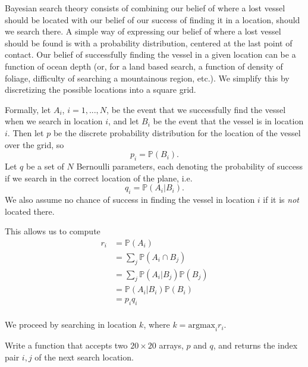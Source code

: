 Bayesian search theory consists of combining our belief of where a lost vessel should be located with our belief of our success of finding it in a location, should we search there. A simple way of expressing our belief of where a lost vessel should be found is with a probability distribution, centered at the last point of contact. Our belief of successfully finding the vessel in a given location can be a function of ocean depth (or, for a land based search, a function of density of foliage, difficulty of searching a mountainous region, etc.). We simplify this by discretizing the possible locations into a square grid.

Formally, let $A_{i}$, $i=1,...,N$, be the event that we successfully find the vessel when we search in location $i$, and let $B_{i}$ be the event that the vessel is in location $i$. Then let $p$ be the discrete probability distribution for the location of the vessel over the grid, so 
\begin{equation*}
p_{i} = \mathbb{P}(B_{i}).
\end{equation*}
Let $q$ be a set of $N$ Bernoulli parameters, each denoting the probability of success if we search in the correct location of the plane, i.e. 
$$q_{i} = \mathbb{P}(A_{i} | B_{i}).$$ We also assume no chance of success in finding the vessel in location $i$ if it is \emph{not} located there.

This allows us to compute 
\begin{align*}
r_{i} & = \mathbb{P}(A_{i}) \\
& = \sum_{j} \mathbb{P}(A_{i} \cap B_{j}) \\
& = \sum_{j} \mathbb{P}(A_{i} | B_{j})\mathbb{P}(B_{j}) \\
& = \mathbb{P}(A_{i} | B_{i})\mathbb{P}(B_{i}) \\
& = p_{i}q_{i} \\
\end{align*}

We proceed by searching in location $k$, where $k = \text{argmax}_{i} r_{i}$.

\begin{problem}
Write a function that accepts two $20 \times 20$ arrays, $p$ and $q$, and returns the index pair $i,j$ of the next search location.
\end{problem}

